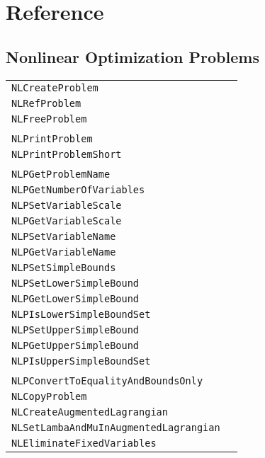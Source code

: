 \documentclass[12pt]{article}
\begin{document}
\section{Reference}

\subsection{Nonlinear Optimization Problems}

\begin{center}
\begin{tabular}{ll}
\tt NLCreateProblem&\pageref{Subroutine:NLCreateProblem}\\
\tt NLRefProblem&\pageref{Subroutine:NLRefProblem}\\
\tt NLFreeProblem&\pageref{Subroutine:NLFreeProblem}\\
\\
\tt NLPrintProblem&\pageref{Subroutine:NLPrintProblem}\\
\tt NLPrintProblemShort&\pageref{Subroutine:NLPrintProblemShort}\\
\\
\tt NLPGetProblemName&\pageref{Subroutine:NLPGetProblemName}\\
\tt NLPGetNumberOfVariables&\pageref{Subroutine:NLPGetNumberOfVariables}\\
\tt NLPSetVariableScale&\pageref{Subroutine:NLPSetVariableScale}\\
\tt NLPGetVariableScale&\pageref{Subroutine:NLPGetVariableScale}\\
\tt NLPSetVariableName&\pageref{Subroutine:NLPSetVariableName}\\
\tt NLPGetVariableName&\pageref{Subroutine:NLPGetVariableName}\\
\tt NLPSetSimpleBounds&\pageref{Subroutine:NLPSetSimpleBounds}\\
\tt NLPSetLowerSimpleBound&\pageref{Subroutine:NLPSetLowerSimpleBound}\\
\tt NLPGetLowerSimpleBound&\pageref{Subroutine:NLPGetLowerSimpleBound}\\
\tt NLPIsLowerSimpleBoundSet&\pageref{Subroutine:NLPIsLowerSimpleBoundSet}\\
\tt NLPSetUpperSimpleBound&\pageref{Subroutine:NLPSetUpperSimpleBound}\\
\tt NLPGetUpperSimpleBound&\pageref{Subroutine:NLPGetUpperSimpleBound}\\
\tt NLPIsUpperSimpleBoundSet&\pageref{Subroutine:NLPIsUpperSimpleBoundSet}\\
\\
\tt NLPConvertToEqualityAndBoundsOnly&\pageref{Subroutine:NLPConvertToEqualityAndBoundsOnly}\\
\tt NLCopyProblem&\pageref{Subroutine:NLCopyProblem}\\
\tt NLCreateAugmentedLagrangian&\pageref{Subroutine:NLCreateAugmentedLagrangian}\\
\tt NLSetLambaAndMuInAugmentedLagrangian&\pageref{Subroutine:NLSetLambaAndMuInAugmentedLagrangian}\\
\tt NLEliminateFixedVariables&\pageref{Subroutine:NLEliminateFixedVariables}\\
\end{tabular}
\end{center}
\end{document}
